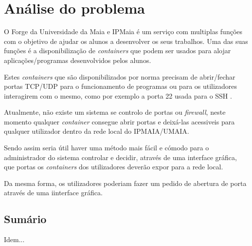 \chapter{Análise do problema}
\label{cap:problem}


O Forge da Universidade da Maia e IPMaia é um serviço com multiplas funções com 
o objetivo de ajudar os alunos a desenvolver os seus trabalhos.
Uma das suas funções é a disponibilização de \textit{containers} que podem ser usados
para alojar aplicações/programas desenvolvidos pelos alunos.

Estes \textit{containers} que são disponibilizados por norma precisam de 
abrir/fechar portas TCP/UDP para o funcionamento de programas ou para os
utilizadores interagirem com o mesmo, como por exemplo a porta 22 usada para o 
SSH \cite{rfc4253}.

Atualmente, não existe um sistema se controlo de portas ou \textit{firewall}, neste
momento qualquer \textit{container} consegue abrir portas e deixá-las acessiveis 
para qualquer utilizador dentro da rede local do IPMAIA/UMAIA.

Sendo assim seria útil haver uma método mais fácil e cómodo para o administrador do sistema
controlar e decidir, através de uma interface gráfica, que portas os \textit{containers} dos utilizadores deverão expor 
para a rede local.

Da mesma forma, os utilizadores poderiam fazer um pedido de abertura de porta através de uma iinterface gráfica.

\section*{Sumário}

Idem... 